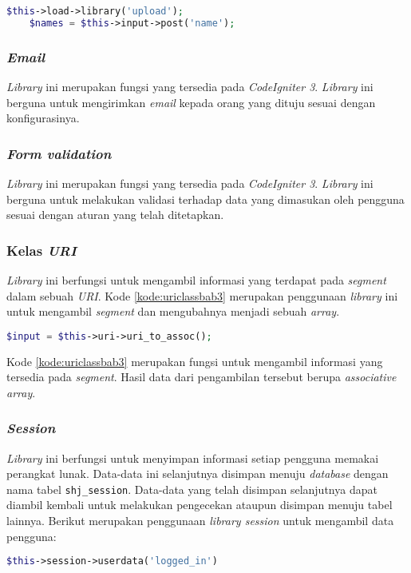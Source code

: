 \begin{lstlisting}[language=PHP, caption=Contoh penggunaan \textit{library input}, label=kode:inputlibbab3]
	$this->load->library('upload');
	$names = $this->input->post('name');
\end{lstlisting}

\subsubsection{\textit{Email}}
\textit{Library} ini merupakan fungsi yang tersedia pada \textit{CodeIgniter 3}. \textit{Library} ini berguna untuk mengirimkan \textit{email} kepada orang yang dituju sesuai dengan konfigurasinya.

\subsubsection{\textit{Form validation}}
\textit{Library} ini merupakan fungsi yang tersedia pada \textit{CodeIgniter 3}. \textit{Library} ini berguna untuk melakukan validasi terhadap data yang dimasukan oleh pengguna sesuai dengan aturan yang telah ditetapkan.

\subsubsection{Kelas \textit{URI}}
\textit{Library} ini berfungsi untuk mengambil informasi yang terdapat pada \textit{segment} dalam sebuah \textit{URI}. Kode \ref{kode:uriclassbab3} merupakan penggunaan \textit{library} ini untuk mengambil \textit{segment} dan mengubahnya menjadi sebuah \textit{array}.
\begin{lstlisting}[language=PHP, caption=Contoh penggunaan \textit{library URI}, label=kode:uriclassbab3]
	$input = $this->uri->uri_to_assoc();
\end{lstlisting}
Kode \ref{kode:uriclassbab3} merupakan fungsi untuk mengambil informasi yang tersedia pada \textit{segment}. Hasil data dari pengambilan tersebut berupa \textit{associative array}.

\subsubsection{\textit{Session}}
\textit{Library} ini berfungsi untuk menyimpan informasi setiap pengguna memakai perangkat lunak. Data-data ini selanjutnya disimpan menuju \textit{database} dengan nama tabel \texttt{shj\_session}. Data-data yang telah disimpan selanjutnya dapat diambil kembali untuk melakukan pengecekan ataupun disimpan menuju tabel lainnya. Berikut merupakan penggunaan \textit{library session} untuk mengambil data pengguna:
\begin{lstlisting}[language=PHP, caption=Contoh penggunaan \textit{library session}, label=kode:sessionbab3]
	$this->session->userdata('logged_in')
\end{lstlisting}

